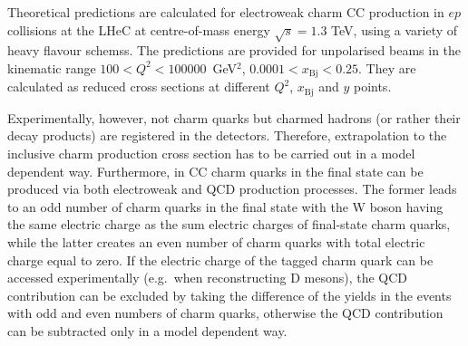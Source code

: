 \documentclass[pdftex,twocolumn,epjc3]{svjour3}          %
\newcommand{\xbj}{\ensuremath{x_{\text{Bj}}}\xspace}
\begin{document}
Theoretical predictions are calculated for electroweak charm CC production in $ep$ collisions at the LHeC at centre-of-mass energy $\sqrt{s} = 1.3$ TeV, using a variety 
of heavy flavour schemss. The predictions are provided for unpolarised beams in the kinematic range $100 < Q^2 < 100000$~GeV$^2$, $0.0001 < \xbj < 0.25$. They are calculated as reduced cross sections at different $Q^2$, \xbj and $y$ points.

{\color{blue}
Experimentally, however, not charm quarks but charmed hadrons (or rather their decay products) are registered in the detectors. 
Therefore, extrapolation to the inclusive charm production cross section has to be carried out in a model dependent way.
Furthermore, in CC charm quarks in the final state can be produced via both electroweak and QCD production processes.
The former leads to an odd number of charm quarks in the final state with the W boson having the same electric charge as the sum electric charges of final-state charm quarks, while the latter creates an even number of charm quarks with total electric charge equal to zero.
If the electric charge of the tagged charm quark can be accessed experimentally (e.g.\ when reconstructing D mesons), the QCD contribution can be excluded by taking the difference of the yields in the events with odd and even numbers of charm quarks, otherwise the QCD contribution can be subtracted only in a model dependent way.
}
\end{document}
